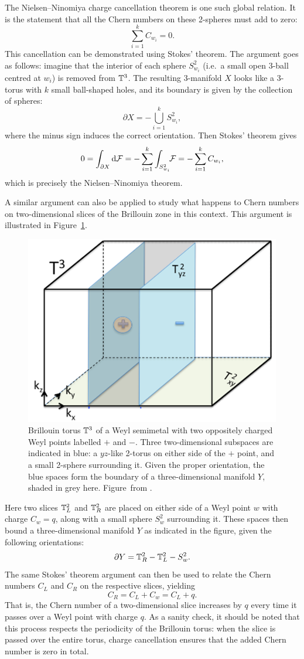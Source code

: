 The Nielsen--Ninomiya charge cancellation theorem is one such global relation. It is the statement that all the Chern numbers on these 2-spheres must add to zero:
\begin{equation}
	\sum_{i=1}^{k}C_{w_i} = 0.
\end{equation}
This cancellation can be demonstrated using Stokes' theorem. The argument goes as follows: imagine that the interior of each sphere $S_{w_i}^2$ (i.e.\ a small open 3-ball centred at $w_i$) is removed from $\mathbb{T}^3$. The resulting 3-manifold $X$ looks like a 3-torus with $k$ small ball-shaped holes, and its boundary is given by the collection of spheres:
\[
	\partial X = -\bigcup_{i=1}^k S_{w_i}^2,
\]
where the minus sign induces the correct orientation. Then Stokes' theorem gives
\[
	0 = \int_{\partial X} \dd{\mathcal{F}} = -\sum_{i=1}^{k}\int_{S_{w_i}^2}\!\!\mathcal{F} = -\sum_{i=1}^{k}C_{w_i},
\]
which is precisely the Nielsen--Ninomiya theorem.

A similar argument can also be applied to study what happens to Chern numbers on two-dimensional slices of the Brillouin zone in this context. This argument is illustrated in Figure~\ref{fig:Weyl-point-Stokes}.
\begin{figure}[htb!]
	\centering
	\includegraphics[width=.5\linewidth]{Images/Weyl-point-Stokes}
	\caption{
		Brillouin torus $\mathbb{T}^3$ of a Weyl semimetal with two oppositely charged Weyl points labelled $+$ and $-$. Three two-dimensional subspaces are indicated in blue: a $yz$-like 2-torus on either side of the $+$ point, and a small 2-sphere surrounding it. Given the proper orientation, the blue spaces form the boundary of a three-dimensional manifold $Y$, shaded in grey here.
		Figure~from \cite{Mathai_math-review}. %
	}
	\label{fig:Weyl-point-Stokes}
\end{figure}
Here two slices $\mathbb{T}_L^2$ and $\mathbb{T}_R^2$ are placed on either side of a Weyl point $w$ with charge $C_w = q$, along with a small sphere $S_w^2$ surrounding it. These spaces then bound a three-dimensional manifold $Y$ as indicated in the figure, given the following orientations:
\[
	\partial Y = \mathbb{T}_R^2 - \mathbb{T}_L^2 - S_w^2.
\]
The same Stokes' theorem argument can then be used to relate the Chern numbers $C_L$ and $C_R$ on the respective slices, yielding
\[
	C_R = C_L + C_w = C_L + q.
\]
That is, the Chern number of a two-dimensional slice increases by $q$ every time it passes over a Weyl point with charge $q$. As a sanity check, it should be noted that this process respects the periodicity of the Brillouin torus: when the slice is passed over the entire torus, charge cancellation ensures that the added Chern number is zero in total.

